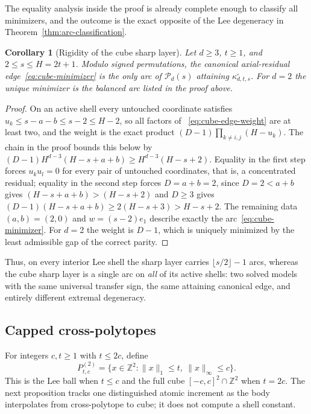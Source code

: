 \documentclass[pdflatex,sn-mathphys-num]{sn-jnl}
\theoremstyle{thmstyleone}
\newtheorem{corollary}[theorem]{Corollary}
\theoremstyle{thmstylethree}
\theoremstyle{thmstyletwo}
\newcommand{\Z}{\mathbb Z}
\begin{document}
The equality analysis inside the proof is already complete enough to
classify all minimizers, and the outcome is the exact opposite of the Lee
degeneracy in Theorem~\ref{thm:arc-classification}.

\begin{corollary}[Rigidity of the cube sharp layer]
\label{cor:cube-arc-classification}
Let $d\ge3$, $t\ge1$, and $2\le s\le H=2t+1$.  Modulo signed permutations,
the canonical axial-residual edge~\eqref{eq:cube-minimizer} is the
\emph{only} arc of $\mathcal P_d(s)$ attaining $\kappa^\square_{d,t,s}$.
For $d=2$ the unique minimizer is the balanced arc listed in the proof
above.
\end{corollary}

\begin{proof}
On an active shell every untouched coordinate satisfies
$u_k\le s-a-b\le s-2\le H-2$, so all factors of
~\eqref{eq:cube-edge-weight} are at least two, and the weight is the exact
product $(D-1)\prod_{k\ne i,j}(H-u_k)$.  The chain in the proof bounds this
below by $(D-1)H^{d-3}(H-s+a+b)\ge H^{d-3}(H-s+2)$.  Equality in the first
step forces $u_ku_l=0$ for every pair of untouched coordinates, that is, a
concentrated residual; equality in the second step forces $D=a+b=2$, since
$D=2<a+b$ gives $(H-s+a+b)>(H-s+2)$ and $D\ge3$ gives
$(D-1)(H-s+a+b)\ge2(H-s+3)>H-s+2$.  The remaining data $(a,b)=(2,0)$ and
$w=(s-2)e_1$ describe exactly the arc~\eqref{eq:cube-minimizer}.  For
$d=2$ the weight is $D-1$, which is uniquely minimized by the least
admissible gap of the correct parity.
\end{proof}

Thus, on every interior Lee shell the sharp layer carries
$\lfloor s/2\rfloor-1$ arcs, whereas the cube sharp layer is a single arc on
\emph{all} of its active shells: two solved models with the same universal
transfer sign, the same attaining canonical edge, and entirely different
extremal degeneracy.

\subsection{Capped cross-polytopes}

For integers $c,t\ge1$ with $t\le2c$, define
\[
 P_{t,c}^{(2)}
 =\{x\in\Z^2:\|x\|_1\le t,\ \|x\|_\infty\le c\}.
\]
This is the Lee ball when $t\le c$ and the full cube $[-c,c]^2\cap\Z^2$
when $t=2c$.  The next proposition tracks one distinguished atomic
increment as the body interpolates from cross-polytope to cube; it does not
compute a shell constant.
\end{document}

